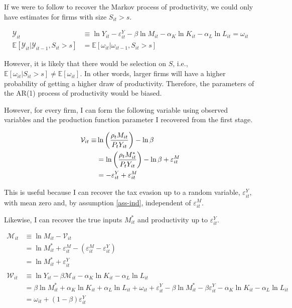 \documentclass[
  12pt]{article}
\theoremstyle{definition}
\theoremstyle{remark}
\begin{document}
If we were to follow \citet{Gandhi2020} to recover the Markov process of
productivity, we could only have estimates for firms with size
\(S_{it}>s\).

\[
\begin{aligned}
    \mathcal Y_{it}&\equiv \ln Y_{it}-\varepsilon^Y_{it}-\beta \ln M_{it}-\alpha_K \ln K_{it}-\alpha_L \ln L_{it}= \omega_{it}\\
    \mathbb{E}[\mathcal Y_{it}|\mathcal Y_{it-1},S_{it}>s] &= \mathbb{E}[\omega_{it}|\omega_{it-1},S_{it}>s] 
\end{aligned}
\]

However, it is likely that there would be selection on \(S\), i.e.,
\(\mathbb{E}[\omega_{it}|S_{it}>s]\not=\mathbb{E}[\omega_{it}]\). In
other words, larger firms will have a higher probability of getting a
higher draw of productivity. Therefore, the parameters of the AR(1)
process of productivity would be biased.

However, for every firm, I can form the following variable using
observed variables and the production function parameter I recovered
from the first stage.

\[
\begin{aligned}
    \mathcal V_{it}\equiv&\ln\left(\frac{\rho_t M_{it}}{P_{t}Y_{it}}\right)-\ln\beta \notag \\
    &=\ln\left(\frac{\rho_tM^*_{it}}{P_{t}Y_{it}}\right)-\ln\beta+\varepsilon^M_{it} \notag \\
    &=-\varepsilon^Y_{it} +\varepsilon^M_{it}
\end{aligned}
\]

This is useful because I can recover the tax evasion up to a random
variable, \(\varepsilon^Y_{it}\), with mean zero and, by assumption
\ref{ass-ind}, independent of \(\varepsilon^M_{it}\).

Likewise, I can recover the true inputs \(M^*_{it}\) and productivity up
to \(\varepsilon^Y_{it}\).

\[
\begin{aligned}
    \mathcal M_{it}&\equiv \ln M_{it}-\mathcal V_{it}\\
    & = \ln M^*_{it} +\varepsilon^M_{it}-(\varepsilon^M_{it}- \varepsilon^Y_{it}) \\
    & = \ln M^*_{it} + \varepsilon^Y_{it} \\
    \\
    \mathcal W_{it} & \equiv \ln Y_{it} - \beta\mathcal M_{it}-\alpha_K \ln K_{it}-\alpha_L \ln L_{it}\\
    & = \beta\ln M^*_{it}+\alpha_K \ln K_{it}+\alpha_L \ln L_{it}+\omega_{it}+\varepsilon^Y_{it}-\beta\ln M^*_{it}-\beta\varepsilon^Y_{it}-\alpha_K \ln K_{it}-\alpha_L \ln L_{it} \\
    & = \omega_{it}+(1-\beta)\varepsilon^Y_{it}
\end{aligned}
\]
\end{document}
